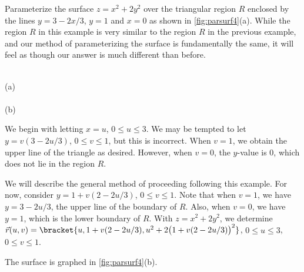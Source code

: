\begin{example}\label{ex_parsurf4}
Parameterize the surface $z=x^2+2y^2$ over the triangular region $R$ enclosed by the  lines $y=3-2x/3$, $y=1$ and $x=0$ as shown in \autoref{fig:parsurf4}(a).
\solution
While the region $R$ in this example is very similar to the region $R$ in the previous example, and our method of parameterizing the surface is fundamentally the same, it will feel as though our answer is much different than before.

{
\\[-5pt](a)\\[10pt]
\\(b)}

We begin with letting $x=u$, $0\leq u\leq 3$. We may be tempted to let $y = v(3-2u/3)$, $0\leq v\leq 1$, but this is incorrect. When $v = 1$, we obtain the upper line of the triangle as desired. However, when $v=0$, the $y$-value is 0, which does not lie in the region $R$. 

We will describe the general method of proceeding following this example. For now, consider $y = 1+v(2-2u/3)$, $0\leq v\leq 1$. Note that when $v=1$, we have $y=3-2u/3$, the upper line of the boundary of $R$. Also, when $v=0$, we have $y=1$, which is the lower boundary of $R$. With $z=x^2+2y^2$, we determine $\vec r(u,v) =\bracket{u, 1+v(2-2u/3), u^2+2\bigl(1+v(2-2u/3)\bigr)^2}$, $0\leq u\leq 3$, $0\leq v\leq 1$. 

The surface is graphed in \autoref{fig:parsurf4}(b).
\end{example}

